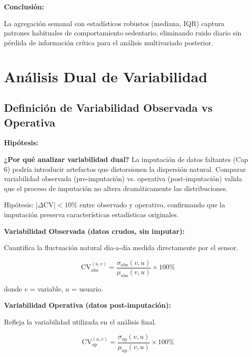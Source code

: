 \documentclass[12pt,letterpaper,twoside]{report}
\begin{document}
\begin{conclusionbox}
\textbf{Conclusión:}

La agregación semanal con estadísticos robustos (mediana, IQR) captura patrones habituales de comportamiento sedentario, eliminando ruido diario sin pérdida de información crítica para el análisis multivariado posterior.
\end{conclusionbox}

\section{Análisis Dual de Variabilidad}

\subsection{Definición de Variabilidad Observada vs Operativa}

\begin{hipotesisbox}
\textbf{Hipótesis:}

\textbf{¿Por qué analizar variabilidad dual?} La imputación de datos faltantes (Cap 6) podría introducir artefactos que distorsionen la dispersión natural. Comparar variabilidad observada (pre-imputación) vs. operativa (post-imputación) valida que el proceso de imputación no altera dramáticamente las distribuciones.

Hipótesis: $|\Delta\text{CV}| < 10\%$ entre observado y operativo, confirmando que la imputación preserva características estadísticas originales.
\end{hipotesisbox}

\begin{estadisticobox}
\textbf{Variabilidad Observada (datos crudos, sin imputar):}

Cuantifica la fluctuación natural día-a-día medida directamente por el sensor.

\begin{equation}
\text{CV}_{\text{obs}}^{(u,v)} = \frac{\sigma_{\text{obs}}(v, u)}{\mu_{\text{obs}}(v, u)} \times 100\%
\end{equation}

donde $v$ = variable, $u$ = usuario.

\textbf{Variabilidad Operativa (datos post-imputación):}

Refleja la variabilidad utilizada en el análisis final.

\begin{equation}
\text{CV}_{\text{op}}^{(u,v)} = \frac{\sigma_{\text{op}}(v, u)}{\mu_{\text{op}}(v, u)} \times 100\%
\end{equation}
\end{estadisticobox}
\end{document}
